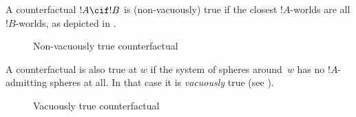 \documentclass[../../../include/open-logic-section]{subfiles}
\begin{document}


A counterfactual $!A \cif !B$ is (non-vacuously) true if the closest
$!A$-worlds are all $!B$-worlds, as depicted in .
\begin{figure}
\begin{center}
\caption{Non-vacuously true counterfactual}
\end{center}
\end{figure}
A counterfactual is also true at $w$ if the system of spheres
around~$w$ has no $!A$-admitting spheres at all. In that case it is
\emph{vacuously} true (see  ).
\begin{figure}
\begin{center}
\caption{Vacuously true counterfactual}
\end{center}
\end{figure}
\end{document}
